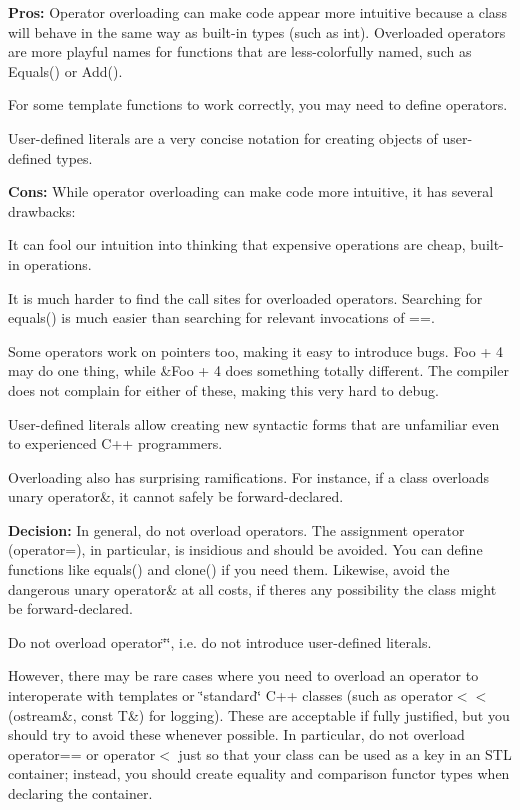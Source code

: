 {\bfseries Pros\+:} Operator overloading can make code appear more intuitive because a class will behave in the same way as built-\/in types (such as int). Overloaded operators are more playful names for functions that are less-\/colorfully named, such as {\ttfamily Equals()} or {\ttfamily Add()}.

For some template functions to work correctly, you may need to define operators.

User-\/defined literals are a very concise notation for creating objects of user-\/defined types.

{\bfseries Cons\+:} While operator overloading can make code more intuitive, it has several drawbacks\+:


\begin{DoxyItemize}
\item It can fool our intuition into thinking that expensive operations are cheap, built-\/in operations.
\item It is much harder to find the call sites for overloaded operators. Searching for {\ttfamily equals()} is much easier than searching for relevant invocations of {\ttfamily ==}.
\item Some operators work on pointers too, making it easy to introduce bugs. Foo + 4 may do one thing, while \&Foo + 4 does something totally different. The compiler does not complain for either of these, making this very hard to debug.
\item User-\/defined literals allow creating new syntactic forms that are unfamiliar even to experienced C++ programmers.
\end{DoxyItemize}

Overloading also has surprising ramifications. For instance, if a class overloads unary operator\&, it cannot safely be forward-\/declared.

{\bfseries Decision\+:} In general, do not overload operators. The assignment operator ({\ttfamily operator=}), in particular, is insidious and should be avoided. You can define functions like {\ttfamily equals()} and {\ttfamily clone()} if you need them. Likewise, avoid the dangerous unary operator\& at all costs, if there\textquotesingle{}s any possibility the class might be forward-\/declared.

Do not overload {\ttfamily operator\char`\"{}\char`\"{}}, i.\+e. do not introduce user-\/defined literals.

However, there may be rare cases where you need to overload an operator to interoperate with templates or \char`\"{}standard\char`\"{} C++ classes (such as {\ttfamily operator$<$$<$ (ostream\&, const T\&)} for logging). These are acceptable if fully justified, but you should try to avoid these whenever possible. In particular, do not overload {\ttfamily operator==} or {\ttfamily operator$<$} just so that your class can be used as a key in an S\+TL container; instead, you should create equality and comparison functor types when declaring the container.


